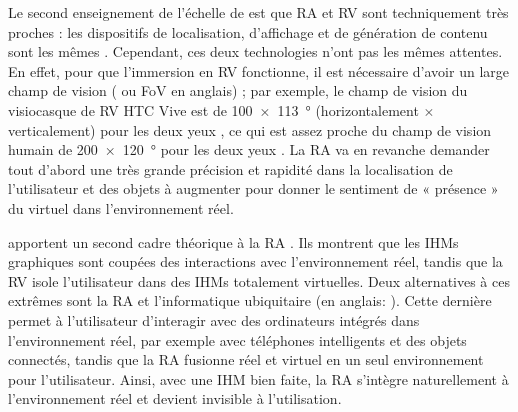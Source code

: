 Le second enseignement de l'échelle de \citeauthor{Milgram1994} est que RA et RV sont techniquement très proches : les dispositifs de localisation, d'affichage et de génération de contenu sont les mêmes \citep{Billinghurst2015}. Cependant, ces deux technologies n'ont pas les mêmes attentes. En effet, pour que l'immersion en RV fonctionne, il est nécessaire d'avoir un large champ de vision ( ou FoV en anglais) ; par exemple, le champ de vision du visiocasque de RV HTC Vive est de \SI{100x113}{\degree} (horizontalement $\times$ verticalement) pour les deux yeux \citep{Kreylos2016}, ce qui est assez proche du champ de vision humain de \SI{200x120}{\degree} pour les deux yeux \citep{Cockburn2008}. La RA va en revanche demander tout d'abord une très grande précision et rapidité dans la localisation de l'utilisateur et des objets à augmenter pour donner le sentiment de « présence » du virtuel dans l'environnement réel.


\cite{Rekimoto1995} apportent un second cadre théorique à la RA . Ils montrent que les IHMs graphiques sont coupées des interactions avec l'environnement réel, tandis que la RV isole l'utilisateur dans des IHMs totalement virtuelles. Deux alternatives à ces extrêmes sont la RA et l'informatique ubiquitaire (en anglais: ). Cette dernière permet à l'utilisateur d'interagir avec des ordinateurs intégrés dans l'environnement réel, par exemple avec téléphones intelligents et des objets connectés, tandis que la RA fusionne réel et virtuel en un seul environnement pour l'utilisateur. Ainsi, avec une IHM bien faite, la RA s'intègre naturellement à l'environnement réel et devient invisible à l'utilisation.

